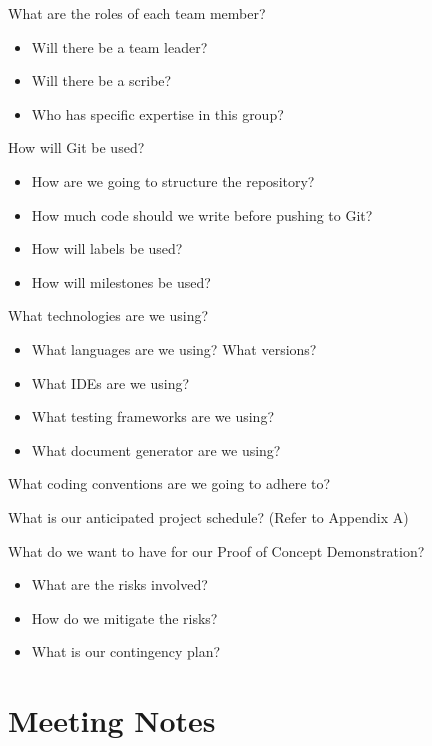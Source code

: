 \documentclass[11pt]{meetingmins}
\begin{document}
\begin{hiddenitems}
\item
What are the roles of each team member?
\begin{itemize}
	\item{Will there be a team leader?}
	\item{Will there be a scribe?}
	\item{Who has specific expertise in this group?}
\end{itemize}

\item
How will Git be used?
\begin{itemize}
	\item{How are we going to structure the repository?}
	\item{How much code should we write before pushing to Git?}
	\item{How will labels be used?}
	\item{How will milestones be used?}
\end{itemize}

\item
What technologies are we using?
\begin{itemize}
	\item{What languages are we using? What versions?}
	\item{What IDEs are we using?}
	\item{What testing frameworks are we using?}
	\item{What document generator are we using?}
\end{itemize}

\item
What coding conventions are we going to adhere to?

\item
What is our anticipated project schedule? (Refer to Appendix A)

\item
What do we want to have for our Proof of Concept Demonstration?
\begin{itemize}
	\item{What are the risks involved?}
	\item{How do we mitigate the risks?}
	\item{What is our contingency plan?}
\end{itemize}
\end{hiddenitems}

\section{Meeting Notes}
\end{document}
